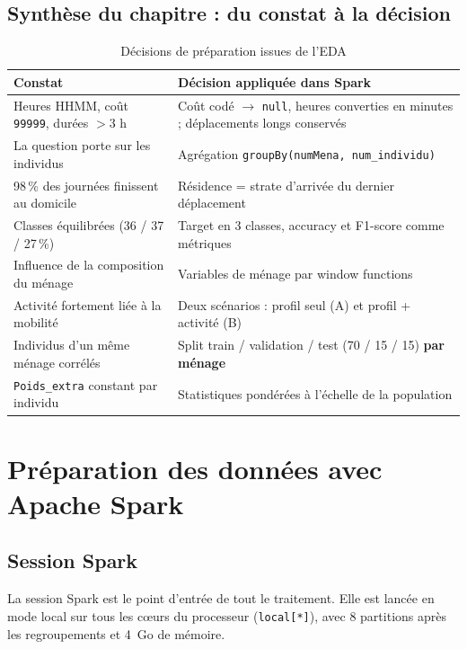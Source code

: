 \documentclass[12pt,a4paper]{report}
\newcommand{\code}[1]{\texttt{\small #1}}
\newcommand{\1}{\mathbf{1}}
\begin{document}
\section{Synthèse du chapitre : du constat à la décision}
\begin{table}[H]
\centering
\caption{Décisions de préparation issues de l'EDA}\label{tab:decisions}
\small
\begin{tabularx}{\linewidth}{@{}XX@{}}
\toprule
\textbf{Constat} & \textbf{Décision appliquée dans Spark} \\
\midrule
Heures HHMM, coût \code{99999}, durées \(> 3\) h & Coût codé \(\rightarrow\) \code{null}, heures converties en minutes ; déplacements longs conservés \\
La question porte sur les individus & Agrégation \code{groupBy(numMena, num\_individu)} \\
98\,\% des journées finissent au domicile & Résidence = strate d'arrivée du dernier déplacement \\
Classes équilibrées (36 / 37 / 27\,\%) & Target en 3 classes, accuracy et F1-score comme métriques \\
Influence de la composition du ménage & Variables de ménage par window functions \\
Activité fortement liée à la mobilité & Deux scénarios : profil seul (A) et profil + activité (B) \\
Individus d'un même ménage corrélés & Split train / validation / test (70 / 15 / 15) \textbf{par ménage} \\
\code{Poids\_extra} constant par individu & Statistiques pondérées à l'échelle de la population \\
\bottomrule
\end{tabularx}
\end{table}


\chapter{Préparation des données avec Apache Spark}\label{ch:spark}

\section{Session Spark}
La session Spark est le point d'entrée de tout le traitement. Elle est lancée en mode local sur tous les cœurs du processeur (\code{local[*]}), avec 8 partitions après les regroupements et 4~Go de mémoire.
\end{document}
